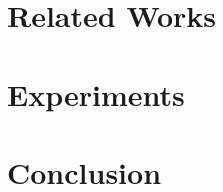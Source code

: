 \documentclass[11pt, a4paper, logo, copyright, gdm]{google}
\begin{document}
\section{Related Works}
\label{sec:adjacentworks}


\section{Experiments}
\label{sec:experiments}


\section{Conclusion}

\FloatBarrier
\begingroup
\small
\setlength{\bibsep}{4pt}
\setlength{\parskip}{0pt}


\endgroup

\clearpage
\appendix

\end{document}
